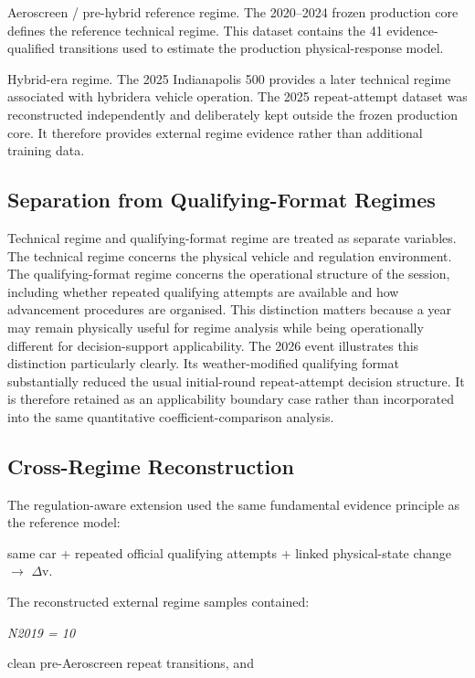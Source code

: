 Aeroscreen / pre-hybrid reference regime. The 2020--2024 frozen production core defines the reference technical regime. This dataset contains the 41 evidence-qualified transitions used to estimate the production physical-response model.

Hybrid-era regime. The 2025 Indianapolis 500 provides a later technical regime associated with hybridera vehicle operation. The 2025 repeat-attempt dataset was reconstructed independently and deliberately kept outside the frozen production core. It therefore provides external regime evidence rather than additional training data.

\subsection{Separation from Qualifying-Format Regimes}
Technical regime and qualifying-format regime are treated as separate variables. The technical regime concerns the physical vehicle and regulation environment. The qualifying-format regime concerns the operational structure of the session, including whether repeated qualifying attempts are available and how advancement procedures are organised. This distinction matters because a year may remain physically useful for regime analysis while being operationally different for decision-support applicability. The 2026 event illustrates this distinction particularly clearly. Its weather-modified qualifying format substantially reduced the usual initial-round repeat-attempt decision structure. It is therefore retained as an applicability boundary case rather than incorporated into the same quantitative coefficient-comparison analysis.

\subsection{Cross-Regime Reconstruction}
The regulation-aware extension used the same fundamental evidence principle as the reference model:

same car + repeated official qualifying attempts + linked physical-state change \ensuremath{\rightarrow} \ensuremath{\Delta}v.

The reconstructed external regime samples contained:

\begin{center}\textit{N2019 = 10}\end{center}

clean pre-Aeroscreen repeat transitions, and

